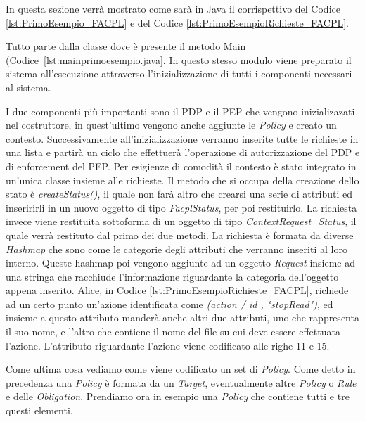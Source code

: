 In questa sezione verrà mostrato come sarà in Java il corrispettivo del Codice \ref{lst:PrimoEsempio_FACPL} e del Codice \ref{lst:PrimoEsempioRichieste_FACPL}.\\ \par
Tutto parte dalla classe dove è presente il metodo Main (Codice~\ref{lst:mainprimoesempio.java}. In questo stesso modulo viene preparato il sistema all'esecuzione attraverso l'inizializzazione di tutti i componenti necessari al sistema.\\ \par
I due componenti più importanti sono il PDP e il PEP che vengono inizializazati nel costruttore, in quest'ultimo vengono anche aggiunte le \textit{Policy} e creato un contesto. Successivamente all'inizializzazione verranno inserite tutte le richieste in una lista e partirà un ciclo che effettuerà l'operazione di autorizzazione del PDP e di enforcement del PEP.
Per esigienze di comodità il contesto è stato integrato in un'unica classe insieme alle richieste.
Il metodo che si occupa della creazione dello stato è \textit{createStatus()}, il quale non farà altro che crearsi una serie di attributi ed inseririrli in un nuovo oggetto di tipo \textit{FacplStatus}, per poi restituirlo.
La richiesta invece viene restituita sottoforma di un oggetto di tipo \textit{ContextRequest\_Status}, il quale verrà restituto dal primo dei due metodi. La richiesta è formata da diverse \textit{Hashmap} che sono come le categorie degli attributi che verranno inseriti al loro interno.
Queste hashmap poi vengono aggiunte ad un oggetto \textit{Request} insieme ad una stringa che racchiude l'informazione riguardante la categoria dell'oggetto appena inserito.
Alice, in Codice \ref{lst:PrimoEsempioRichieste_FACPL}, richiede ad un certo punto un'azione identificata come \textit{(action / id , "stopRead")}, ed insieme a questo attributo manderà anche altri due attributi, uno che rappresenta il suo nome, e l'altro che contiene il nome del file su cui deve essere effettuata l'azione. L'attributo riguardante l'azione viene codificato alle righe 11 e 15.\\ \par
Come ultima cosa vediamo come viene codificato un set di \textit{Policy}. Come detto in precedenza una \textit{Policy} è formata da un \textit{Target}, eventualmente altre \textit{Policy} o \textit{Rule} e delle \textit{Obligation}. Prendiamo ora in esempio una \textit{Policy} che contiene tutti e tre questi elementi.
